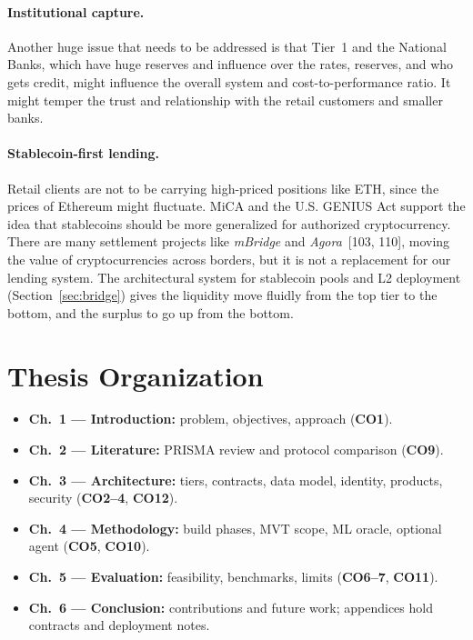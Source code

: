 \documentclass[12pt, a4paper]{report}
\begin{document}
\paragraph{Institutional capture.} Another huge issue that needs to be addressed is that Tier~1 and the National Banks, which have huge reserves and influence over the rates, reserves, and who gets credit, might influence the overall system and cost-to-performance ratio. It might temper the trust and relationship with the retail customers and smaller banks.

\paragraph{Stablecoin-first lending.}
\label{sec:stablecoin-first}
Retail clients are not to be carrying high-priced positions like ETH, since the prices of Ethereum might fluctuate. MiCA and the U.S. GENIUS Act support the idea that stablecoins should be more generalized for authorized cryptocurrency. There are many settlement projects like \textit{mBridge} and \textit{Agora}~[103, 110], moving the value of cryptocurrencies across borders, but it is not a replacement for our lending system. The architectural system for stablecoin pools and L2 deployment (Section~\ref{sec:bridge}) gives the liquidity move fluidly from the top tier to the bottom, and the surplus to go up from the bottom.

\section{Thesis Organization}
\label{sec:thesis-organization}

\begin{itemize}[noitemsep]
\item \textbf{Ch.~1 --- Introduction:} problem, objectives, approach (\textbf{CO1}).
\item \textbf{Ch.~2 --- Literature:} PRISMA review and protocol comparison (\textbf{CO9}).
\item \textbf{Ch.~3 --- Architecture:} tiers, contracts, data model, identity, products, security (\textbf{CO2--4}, \textbf{CO12}).
\item \textbf{Ch.~4 --- Methodology:} build phases, MVT scope, ML oracle, optional agent (\textbf{CO5}, \textbf{CO10}).
\item \textbf{Ch.~5 --- Evaluation:} feasibility, benchmarks, limits (\textbf{CO6--7}, \textbf{CO11}).
\item \textbf{Ch.~6 --- Conclusion:} contributions and future work; appendices hold contracts and deployment notes.
\end{itemize}
\end{document}
